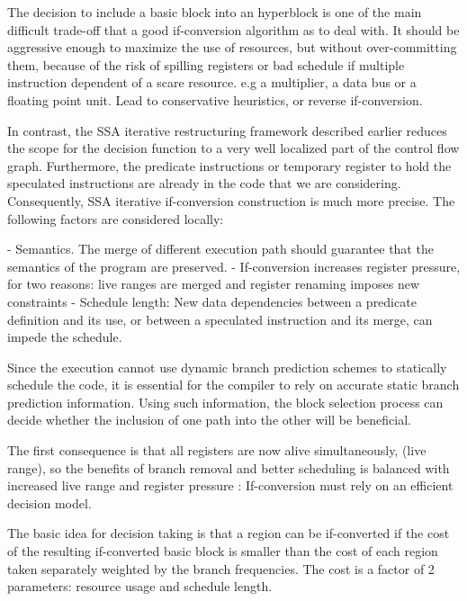 The decision to include a basic block into an hyperblock is one of the main difficult trade-off that a good if-conversion algorithm as to deal with. It should be aggressive enough to maximize the use of resources, but without over-committing them, because of the risk of spilling registers or bad schedule if multiple instruction dependent of a scare resource. e.g a multiplier, a data bus or a floating point unit. Lead to conservative heuristics, or reverse if-conversion.

In contrast, the SSA iterative restructuring framework described earlier reduces the scope for the decision function to a very well localized part of the control flow graph. Furthermore, the predicate instructions or temporary register to hold the speculated instructions are already in the code that we are considering. Consequently, SSA iterative if-conversion construction is much more precise. The following factors are considered locally: 

- Semantics. The merge of different execution path should guarantee that the semantics of the program are preserved.
- If-conversion increases register pressure, for two reasons: live ranges are merged and register renaming imposes new constraints
- Schedule length: New data dependencies between a predicate definition and its use, or between a speculated instruction and its merge, can impede the schedule.

Since the execution cannot use dynamic branch prediction schemes to statically schedule the code, it is essential for the compiler to rely on accurate static branch prediction information. Using such information, the block selection process can decide whether the inclusion of one path into the other will be beneficial. 

The first consequence is that all registers are now alive simultaneously, (live range), so the benefits of branch removal and better scheduling is balanced with increased live range and register pressure : If-conversion must rely on an efficient decision model.

The basic idea for decision taking is that a region can be if-converted if the cost of the resulting if-converted basic block is smaller than the cost of each region taken separately weighted by the branch frequencies. The cost is a factor of 2 parameters: resource usage and schedule length.

